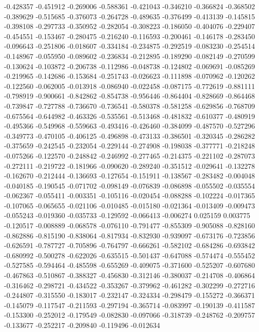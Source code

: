 -0.428357
-0.451912
-0.269006
-0.588361
-0.421043
-0.346210
-0.366824
-0.368502
-0.389629
-0.515685
-0.376073
-0.264728
-0.489635
-0.376499
-0.413139
-0.145815
-0.398108
-0.297733
-0.350952
-0.282054
-0.308223
-0.186050
-0.404076
-0.229407
-0.454551
-0.153467
-0.280475
-0.216240
-0.116593
-0.200461
-0.146178
-0.283450
-0.096643
-0.251806
-0.018607
-0.334184
-0.234875
-0.292519
-0.083230
-0.254514
-0.148967
-0.055950
-0.089602
-0.236834
-0.212895
-0.189290
-0.082149
-0.270599
-0.130624
-0.103872
-0.206738
-0.112986
-0.048738
-0.124802
-0.069691
-0.085269
-0.219965
-0.142686
-0.153684
-0.251743
-0.026623
-0.111898
-0.070962
-0.120262
-0.122560
-0.062005
-0.013918
-0.086940
-0.022458
-0.087175
-0.772619
-0.881111
-0.798919
-0.900661
-0.842862
-0.854738
-0.956446
-0.864404
-0.828669
-0.864468
-0.739847
-0.727788
-0.736670
-0.736541
-0.580378
-0.581258
-0.629856
-0.768709
-0.675564
-0.644982
-0.463326
-0.535561
-0.513468
-0.481832
-0.610377
-0.480919
-0.495366
-0.549968
-0.559663
-0.493416
-0.426460
-0.384099
-0.487570
-0.527296
-0.349773
-0.470105
-0.406125
-0.496898
-0.473133
-0.386501
-0.320345
-0.286282
-0.375659
-0.242545
-0.232054
-0.229144
-0.274908
-0.198038
-0.377771
-0.218248
-0.075266
-0.122570
-0.248842
-0.246992
-0.277465
-0.214375
-0.221102
-0.287073
-0.272111
-0.219722
-0.181966
-0.090620
-0.289240
-0.351512
-0.029641
-0.132278
-0.162670
-0.212444
-0.136693
-0.127654
-0.151911
-0.138567
-0.283482
-0.004048
-0.040185
-0.190545
-0.071702
-0.098149
-0.076839
-0.086898
-0.055502
-0.035554
-0.062367
-0.055411
-0.003351
-0.105116
-0.020454
-0.088288
-0.102224
-0.017365
-0.107065
-0.065655
-0.021106
-0.010485
-0.015180
-0.021364
-0.013409
-0.009473
-0.055243
-0.019360
-0.035733
-0.129592
-0.066413
-0.006274
0.025159
0.003775
-0.120517
-0.008889
-0.068578
-0.076110
-0.791477
-0.855309
-0.905088
-0.828160
-0.862886
-0.815190
-0.838064
-0.817934
-0.832930
-0.939097
-0.673176
-0.723856
-0.626591
-0.787727
-0.705896
-0.764797
-0.666261
-0.582102
-0.684286
-0.693842
-0.680992
-0.500278
-0.622026
-0.635515
-0.501437
-0.647088
-0.574474
-0.555452
-0.527585
-0.594464
-0.485598
-0.655269
-0.409075
-0.371600
-0.525207
-0.607680
-0.467863
-0.510867
-0.388327
-0.456830
-0.312146
-0.380037
-0.214708
-0.406864
-0.316462
-0.298721
-0.434522
-0.353267
-0.379962
-0.461282
-0.302299
-0.272716
-0.244807
-0.315550
-0.183017
-0.232147
-0.324334
-0.298479
-0.155272
-0.366371
-0.145079
-0.117547
-0.211593
-0.297194
-0.365714
-0.083997
-0.190139
-0.411587
-0.153300
-0.252012
-0.179549
-0.082830
-0.097066
-0.318739
-0.248762
-0.209757
-0.133677
-0.252217
-0.209840
-0.119496
-0.012634
